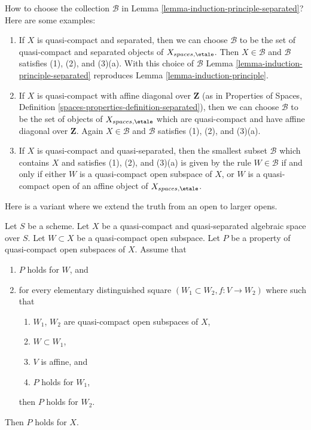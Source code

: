 \begin{remark}
\label{remark-how-to}
How to choose the collection $\mathcal{B}$ in
Lemma \ref{lemma-induction-principle-separated}?
Here are some examples:
\begin{enumerate}
\item If $X$ is quasi-compact and separated, then we can choose
$\mathcal{B}$ to be the set of quasi-compact and separated objects
of $X_{spaces, \etale}$. Then $X \in \mathcal{B}$ and $\mathcal{B}$
satisfies (1), (2), and (3)(a). With this choice of $\mathcal{B}$
Lemma \ref{lemma-induction-principle-separated} reproduces
Lemma \ref{lemma-induction-principle}.
\item If $X$ is quasi-compact with affine diagonal
over $\mathbf{Z}$ (as in Properties of Spaces, Definition
\ref{spaces-properties-definition-separated}), then we can choose
$\mathcal{B}$ to be the set of objects
of $X_{spaces, \etale}$ which are quasi-compact and have affine
diagonal over $\mathbf{Z}$. Again $X \in \mathcal{B}$ and $\mathcal{B}$
satisfies (1), (2), and (3)(a).
\item If $X$ is quasi-compact and quasi-separated, then the
smallest subset $\mathcal{B}$ which contains $X$ and satisfies
(1), (2), and (3)(a) is given by the rule $W \in \mathcal{B}$ if and only
if either $W$ is a quasi-compact open subspace of $X$, or
$W$ is a quasi-compact open of an affine object of $X_{spaces, \etale}$.
\end{enumerate}
\end{remark}

\noindent
Here is a variant where we extend the truth from an open to larger opens.

\begin{lemma}
\label{lemma-induction-principle-enlarge}
Let $S$ be a scheme. Let $X$ be a quasi-compact and quasi-separated
algebraic space over $S$. Let $W \subset X$ be a quasi-compact open
subspace. Let $P$ be a property of quasi-compact open subspaces of $X$.
Assume that
\begin{enumerate}
\item $P$ holds for $W$, and
\item for every elementary distinguished square
$(W_1 \subset W_2, f : V \to W_2)$ where 
such that
\begin{enumerate}
\item $W_1$, $W_2$ are quasi-compact open subspaces of $X$,
\item $W \subset W_1$,
\item $V$ is affine, and
\item $P$ holds for $W_1$,
\end{enumerate}
then $P$ holds for $W_2$.
\end{enumerate}
Then $P$ holds for $X$.
\end{lemma}

